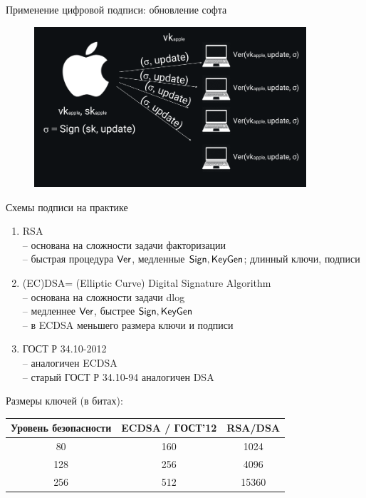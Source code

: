 \documentclass[usenames,dvipsnames,8pt,aspectratio=169]{beamer}
\begin{document}
\begin{frame}{Применение цифровой подписи: обновление софта}

\begin{figure}
	\hspace{-60pt}
	\includegraphics[width=0.9\textwidth]{Signature_software}
\end{figure}
\end{frame}

\begin{frame}{Схемы подписи на практике}
\Large
\begin{enumerate}
	\itemsep10pt
	\item {\color{Orange} RSA} \\
	-- основана на сложности задачи {\color{Orange} факторизации}\\
	-- быстрая процедура $\textsf{Ver}$, медленные $\textsf{Sign}, \textsf{KeyGen}$; длинный ключи, подписи
	
	\item {\color{Orange} (EC)DSA= (Elliptic Curve) Digital Signature Algorithm} \\
	-- основана на сложности задачи  {\color{Orange} dlog}\\
	-- медленнее $\textsf{Ver}$, быстрее $\textsf{Sign}, \textsf{KeyGen}$\\
	-- в ECDSA меньшего размера ключи и подписи
	\pause
	\item {\color{Orange} ГОСТ Р 34.10-2012 }  \\
	-- аналогичен ECDSA \\
	-- старый ГОСТ Р 34.10-94 аналогичен DSA
\end{enumerate}
\pause
\centering

Размеры ключей (в битах):\\[5pt]
\begin{tabular}{c | c| c}
	Уровень безопасности & ECDSA / ГОСТ'12 & RSA/DSA \\ \hline
	80 & 160 & 1024 \\
	128 & 256 & 4096 \\
	256 & 512 & 15360
\end{tabular}
\end{frame}
\end{document}
